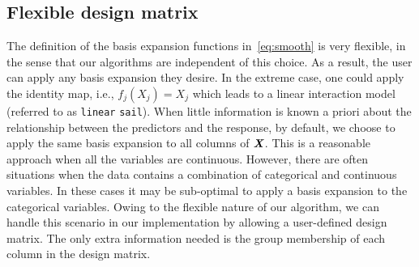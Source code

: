 \documentclass[12pt,letter]{article}\usepackage[]{graphicx}\usepackage[]{color}
\newcommand{\sail}{\texttt{sail}}
\newcommand{\bX}{\textbf{\emph{X}}}
\begin{document}
\subsection{Flexible design matrix} \label{sec:linearsail}

The definition of the basis expansion functions in~\eqref{eq:smooth} is very flexible, in the sense that our algorithms are independent of this choice. As a result, the user can apply any basis expansion they desire. In the extreme case, one could apply the identity map, i.e., $f_j(X_j) = X_j$ which leads to a linear interaction model (referred to as \texttt{linear} \sail). When little information is known a priori about the relationship between the predictors and the response, by default, we choose to apply the same basis expansion to all columns of $\bX$. This is a reasonable approach when all the variables are continuous. However, there are often situations when the data contains a combination of categorical and continuous variables. In these cases it may be sub-optimal to apply a basis expansion to the categorical variables. Owing to the flexible nature of our algorithm, we can handle this scenario in our implementation by allowing a user-defined design matrix. The only extra information needed is the group membership of each column in the design matrix. %
\end{document}
